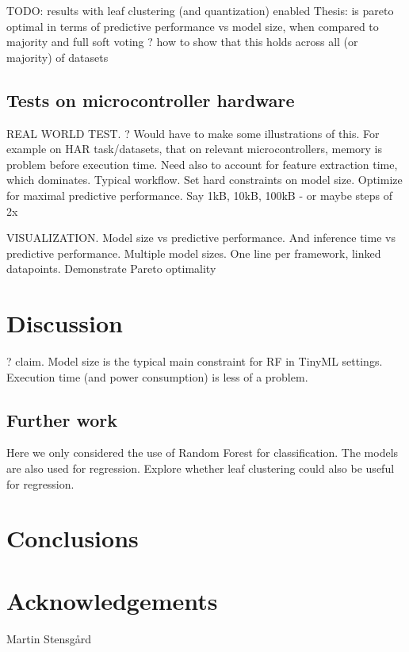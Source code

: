 \documentclass{article}
\begin{document}
TODO: results with leaf clustering (and quantization) enabled
Thesis: is pareto optimal in terms of predictive performance vs model size, when compared to majority and full soft voting
? how to show that this holds across all (or majority) of datasets

\subsection{Tests on microcontroller hardware}

REAL WORLD TEST.
? Would have to make some illustrations of this.
For example on HAR task/datasets, that on relevant microcontrollers, memory is problem before execution time. Need also to account for feature extraction time, which dominates.
Typical workflow. Set hard constraints on model size. Optimize for maximal predictive performance. Say 1kB, 10kB, 100kB - or maybe steps of 2x

VISUALIZATION. Model size vs predictive performance. And inference time vs predictive performance. Multiple model sizes. One line per framework, linked datapoints. Demonstrate Pareto optimality



\section{Discussion}

? claim. Model size is the typical main constraint for RF in TinyML settings.
Execution time (and power consumption) is less of a problem.

\subsection{Further work}

Here we only considered the use of Random Forest for classification.
The models are also used for regression.
Explore whether leaf clustering could also be useful for regression.


\section{Conclusions}


\section*{Acknowledgements}
\noindent

Martin Stensgård

\newpage

 
\end{document}
